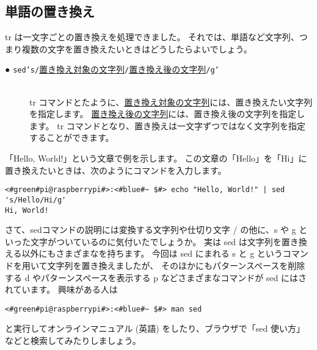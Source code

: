 \subsection{単語の置き換え}
tr は一文字ごとの置き換えを処理できました。
それでは、単語など文字列、つまり複数の文字を置き換えたいときはどうしたらよいでしょう。

\begin{description}
    \item[● \texttt{sed}\textvisiblespace\texttt{'s/}\underline{置き換え対象の文字列}\texttt{/}\underline{置き換え後の文字列}\texttt{/g'}]\mbox{}\\
    tr コマンドとたように、\underline{置き換え対象の文字列}には、置き換えたい文字列を指定します。
    \underline{置き換え後の文字列}には、置き換え後の文字列を指定します。
    tr コマンドとなり、置き換えは一文字ずつではなく文字列を指定することができます。
\end{description}

「Hello, World!」という文章で例を示します。
この文章の「Hello」を「Hi」に置き換えたいときは、次のようにコマンドを入力します。
\begin{lstlisting}[caption=sed コマンドを使った例, label=sed_app]
<#green#pi@raspberrypi#>:<#blue#~ $#> echo "Hello, World!" | sed 's/Hello/Hi/g'
Hi, World!
\end{lstlisting}

さて、sedコマンドの説明には変換する文字列や仕切り文字 / の他に、s や g といった文字がついているのに気付いたでしょうか。
実は sed は文字列を置き換える以外にもさまざまなを持ちます。
今回は sed にまれる s と g というコマンドを用いて文字列を置き換えましたが、
そのほかにもパターンスペースを削除する d やパターンスペースを表示する p などさまざまなコマンドが sed にはされています。
興味がある人は
\begin{lstlisting}
<#green#pi@raspberrypi#>:<#blue#~ $#> man sed
\end{lstlisting}
と実行してオンラインマニュアル (英語) をしたり、ブラウザで「sed 使い方」などと検索してみたりしましょう。

\begin{tcolorbox}[title=\useOmetoi]
    \begin{enumerate}
\end{enumerate}
\end{tcolorbox}

